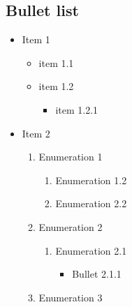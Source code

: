 \documentclass{extarticle}
\begin{document}
\subsection{Bullet list}

\begin{itemize}

\item Item 1

\begin{itemize}

\item item 1.1

\item item 1.2

\begin{itemize}

\item item 1.2.1

\end{itemize}

\end{itemize}

\item Item 2

\begin{enumerate}

\item Enumeration 1

\begin{enumerate}

\item Enumeration 1.2

\item Enumeration 2.2

\end{enumerate}

\item Enumeration 2

\begin{enumerate}

\item Enumeration 2.1

\begin{itemize}

\item Bullet 2.1.1

\end{itemize}

\end{enumerate}

\item Enumeration 3

\end{enumerate}

\end{itemize}
\end{document}
